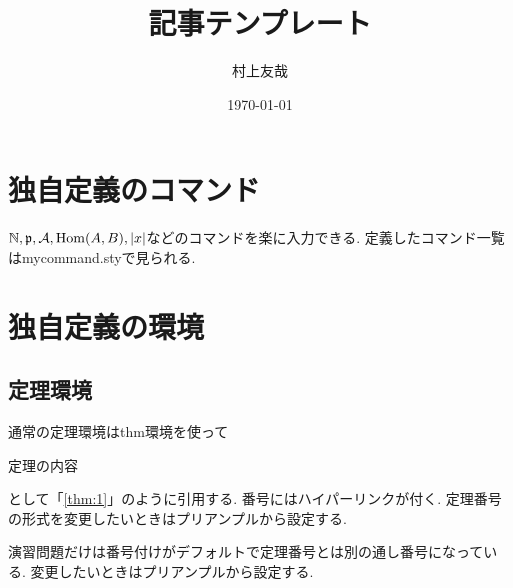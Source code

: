 \documentclass[11pt,a4paper,oneside,lualatex]{ltjsarticle} %
\numberwithin{equation}{section} %
\begin{document}

\title{記事テンプレート}
\author{村上友哉}
\date{\today}

\maketitle

\tableofcontents


\section{独自定義のコマンド} \label{sec:command}


$ \mathbb{N}, \mathfrak{p}, \mathcal{A}, \operatorname{Hom}(A, B), \left\lvert x\right\rvert $などのコマンドを楽に入力できる.
定義したコマンド一覧は\mbox{mycommand.sty}で見られる.


\section{独自定義の環境} \label{sec:environment}



\subsection{定理環境} \label{subsec:thm}


通常の定理環境はthm環境を使って
\begin{thm}[見出し] \label{thm:1}
	定理の内容
\end{thm}
として「\cref{thm:1}」のように引用する.
番号にはハイパーリンクが付く.
定理番号の形式を変更したいときはプリアンプルから設定する.

\begin{exc}
	演習問題だけは番号付けがデフォルトで定理番号とは別の通し番号になっている.
	変更したいときはプリアンプルから設定する.
\end{exc}
\end{document}
